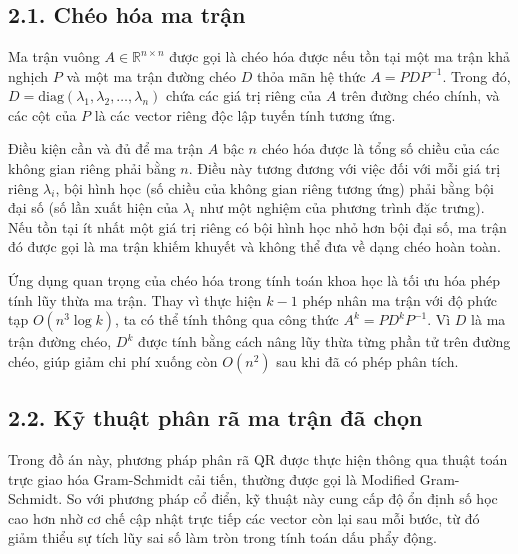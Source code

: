\newpage
\chapter*{}
{}

\section*{2.1. Chéo hóa ma trận}
{}

Ma trận vuông $A \in \mathbb{R}^{n \times n}$ được gọi là chéo hóa được nếu tồn tại một ma trận khả nghịch $P$ và một ma trận đường chéo $D$ thỏa mãn hệ thức $A = P D P^{-1}$. Trong đó, $D = \text{diag}(\lambda_1, \lambda_2, \dots, \lambda_n)$ chứa các giá trị riêng của $A$ trên đường chéo chính, và các cột của $P$ là các vector riêng độc lập tuyến tính tương ứng. 

Điều kiện cần và đủ để ma trận $A$ bậc $n$ chéo hóa được là tổng số chiều của các không gian riêng phải bằng $n$. Điều này tương đương với việc đối với mỗi giá trị riêng $\lambda_i$, bội hình học (số chiều của không gian riêng tương ứng) phải bằng bội đại số (số lần xuất hiện của $\lambda_i$ như một nghiệm của phương trình đặc trưng). Nếu tồn tại ít nhất một giá trị riêng có bội hình học nhỏ hơn bội đại số, ma trận đó được gọi là ma trận khiếm khuyết và không thể đưa về dạng chéo hoàn toàn.

Ứng dụng quan trọng của chéo hóa trong tính toán khoa học là tối ưu hóa phép tính lũy thừa ma trận. Thay vì thực hiện $k-1$ phép nhân ma trận với độ phức tạp $O(n^3 \log k)$, ta có thể tính thông qua công thức $A^k = P D^k P^{-1}$. Vì $D$ là ma trận đường chéo, $D^k$ được tính bằng cách nâng lũy thừa từng phần tử trên đường chéo, giúp giảm chi phí xuống còn $O(n^2)$ sau khi đã có phép phân tích.

\section*{2.2. Kỹ thuật phân rã ma trận đã chọn}
{}
Trong đồ án này, phương pháp phân rã QR được thực hiện thông qua thuật toán trực giao hóa Gram-Schmidt cải tiến, thường được gọi là Modified Gram-Schmidt. So với phương pháp cổ điển, kỹ thuật này cung cấp độ ổn định số học cao hơn nhờ cơ chế cập nhật trực tiếp các vector còn lại sau mỗi bước, từ đó giảm thiểu sự tích lũy sai số làm tròn trong tính toán dấu phẩy động.

